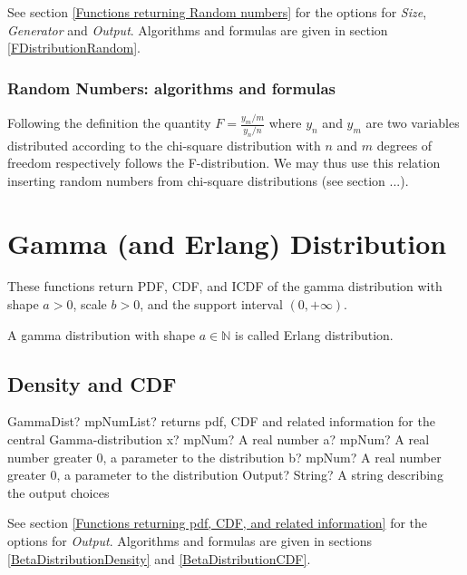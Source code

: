 \vspace{0.3cm}

See section \ref{Functions returning Random numbers} for the options for  {\itshape\sffamily Size},  {\itshape\sffamily Generator} and {\itshape\sffamily Output}. Algorithms and formulas are given in section \ref{FDistributionRandom}.


\subsubsection{Random Numbers: algorithms and formulas}

Following the definition the quantity $F = \frac{y_m/m}{y_n/n}$ where $y_n$ and $y_m$ are two variables distributed according to the chi-square distribution with
$n$ and $m$ degrees of freedom respectively follows the F-distribution. We may thus use this relation inserting random numbers from chi-square distributions (see section ...).





\section{Gamma (and Erlang) Distribution}
\label{GammaDistribution}

These functions return PDF, CDF, and ICDF of the gamma distribution with shape
$a > 0$, scale $b > 0$, and the support interval $(0,+\infty)$.

A gamma distribution with shape $a \in \mathbb{N}$ is called Erlang distribution.

\subsection{Density and CDF}

\begin{mpFunctionsExtract}
	\mpFunctionFour
	{GammaDist? mpNumList? returns pdf, CDF and related information for the central Gamma-distribution}
	{x? mpNum? A real number}
	{a? mpNum? A real number greater 0, a parameter to the distribution}
	{b? mpNum? A real number greater 0, a parameter to the distribution}
	{Output? String? A string describing the output choices}
\end{mpFunctionsExtract}


\vspace{0.3cm}
See section \ref{Functions returning pdf, CDF, and related information} for the options for {\itshape\sffamily Output}. Algorithms and formulas are given in sections \ref{BetaDistributionDensity} and \ref{BetaDistributionCDF}.


